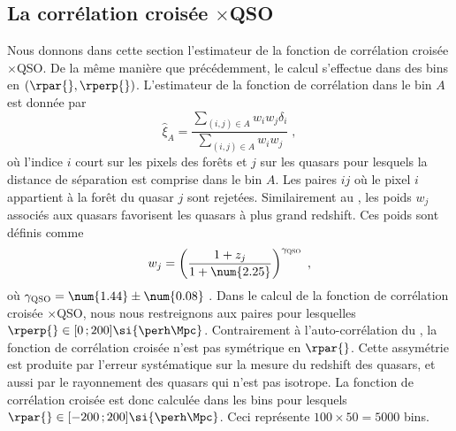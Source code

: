 \subsection{La corrélation croisée \lya{}$\times$QSO}
\label{subsec:xcf_estimateur}
Nous donnons dans cette section l'estimateur de la fonction de corrélation croisée \lya{}$\times$QSO. De la même manière que précédemment, le calcul s'effectue dans des bins en $(\rpar{}, \rperp{})$. L'estimateur de la fonction de corrélation dans le bin $A$ est donnée par
\begin{equation}
  \label{eq:xiqf}
\hat  \xi_A = \frac{
    \sum\limits_{(i,j)\in A} w_i w_j \delta_i
  }{
    \sum\limits_{(i,j)\in A} w_i w_j
  }
  \; ,
\end{equation}
où l'indice $i$ court sur les pixels des forêts et $j$ sur les quasars pour lesquels la distance de séparation est comprise dans le bin $A$. Les paires $ij$ où le pixel $i$ appartient à la forêt du quasar $j$ sont rejetées.
Similairement au \lya{}, les poids $w_j$ associés aux quasars favorisent les quasars à plus grand redshift. Ces poids sont définis comme
\begin{equation}
  \label{eq:weights3}
  w_j = \left(\frac{1 + z_j}{1 + \num{2.25}}\right)^{\gamma_{\textsc{QSO}}} \; ,
\end{equation}
où $\gamma_{\textsc{QSO}} = \num{1.44} \pm \num{0.08}$ \autocite{Bourboux2019}. Dans le calcul de la fonction de corrélation croisée \lya{}$\times$QSO, nous nous restreignons aux paires pour lesquelles $\rperp{} \in [0 \, ; 200] \si{\perh\Mpc}$.
Contrairement à l'auto-corrélation du \lya{}, la fonction de corrélation croisée n'est pas symétrique en $\rpar{}$.
Cette assymétrie est produite par l'erreur systématique sur la mesure du redshift des quasars, et aussi par le rayonnement des quasars qui n'est pas isotrope.
La fonction de corrélation croisée est donc calculée dans les bins pour lesquels $\rpar{} \in [-200 \, ; 200] \si{\perh\Mpc}$. Ceci représente $100 \times 50 = \num{5000}$ bins.



